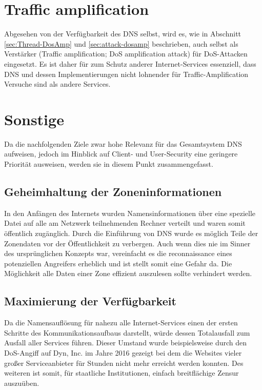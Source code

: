 \section{Traffic amplification}
\label{subsec:goals-trafficamp}
Abgesehen von der Verfügbarkeit des DNS selbst, wird es, wie in Abschnitt \ref{sec:Thread-DosAmp} und \ref{sec:attack-dosamp} beschrieben, auch selbst als Verstärker (Traffic amplification; DoS amplification attack) für DoS-Attacken eingesetzt. Es ist daher für zum Schutz anderer Internet-Services essenziell, dass DNS und dessen Implementierungen nicht lohnender für Traffic-Amplification Versuche sind als andere Services. 

\section{Sonstige}

Da die nachfolgenden Ziele zwar hohe Relevanz für das Gesamtsystem DNS aufweisen, jedoch im Hinblick auf Client- und User-Security eine geringere Priorität ausweisen, werden sie in diesem Punkt zusammengefasst.

\subsection{Geheimhaltung der Zoneninformationen}
In den Anfängen des Internets wurden Namensinformationen über eine spezielle Datei auf alle am Netzwerk teilnehmenden Rechner verteilt \cite{rfc1035} und waren somit öffentlich zugänglich. Durch die Einführung von DNS wurde es möglich Teile der Zonendaten vor der Öffentlichkeit zu verbergen. Auch wenn dies nie im Sinner des ursprünglichen Konzepts war, vereinfacht es die reconnaissance eines potenziellen Angreifers erheblich und ist stellt somit eine Gefahr da. Die Möglichkeit alle Daten einer Zone effizient auszulesen sollte verhindert werden.

\subsection{Maximierung der Verfügbarkeit}
Da die Namensauflösung für nahezu alle Internet-Services einen der ersten Schritte des Kommunikationsaufbaus darstellt, würde dessen Totalausfall zum Ausfall aller Services führen. Dieser Umstand wurde beispielsweise durch den DoS-Angiff auf Dyn, Inc. im Jahre 2016 gezeigt \cite{Newman2016} bei dem die Websites vieler großer Serviceanbieter für Stunden nicht mehr erreicht werden konnten. Des weiteren ist somit, für staatliche Institutionen, einfach breitflächige Zensur auszuüben\cite{turkybbc2017}\cite{turkywp2018}. 


